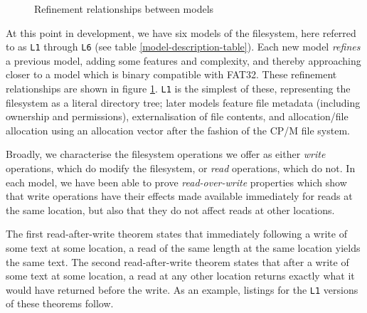 \documentclass[runningheads,a4paper]{llncs}
\begin{document}
\begin{figure}
  \centering
  \caption{Refinement relationships between models}
  \label{refinement-figure}
\end{figure}

At this point in development, we have six models of the filesystem,
here referred to as \texttt{L1} through \texttt{L6} (see
table \ref{model-description-table}). Each new model
\textit{refines} a previous model, adding some features and
complexity, and thereby approaching closer to a model which is binary
compatible with FAT32. These refinement relationships are shown in
figure \ref{refinement-figure}. \texttt{L1} is the simplest of these,
representing the filesystem as a literal directory tree; later models feature
file metadata (including ownership and permissions), externalisation
of file contents, and allocation/file allocation using an allocation
vector after the fashion of the CP/M file system.

Broadly, we characterise the filesystem
operations we offer as either \textit{write} operations, which do
modify the filesystem, or \textit{read} operations, which do not. In
each model, we have been able to prove \textit{read-over-write}
properties which show that write operations have
their effects made available immediately for reads at the same
location, but also that they do not affect reads at other locations.

The first read-after-write theorem states that immediately following a
write of some text at some location, a read of the same length at the
same location yields the same text. The second read-after-write
theorem states that after a write of some text at some location, a
read at any other location returns exactly what it would have returned
before the write. As an example, listings for the \texttt{L1} versions
of these theorems follow.

\medskip
\end{document}
